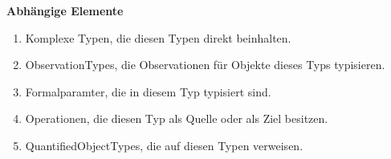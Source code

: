 \textbf{Abhängige Elemente}
\begin{enumerate}
  		\item Komplexe Typen, die diesen Typen direkt beinhalten.
  		\item ObservationTypes, die Observationen für Objekte dieses Typs typisieren.
  		\item Formalparamter, die in diesem Typ typisiert sind.
  		\item Operationen, die diesen Typ als Quelle oder als Ziel besitzen.
  		\item QuantifiedObjectTypes, die auf diesen Typen verweisen. 
\end{enumerate}
